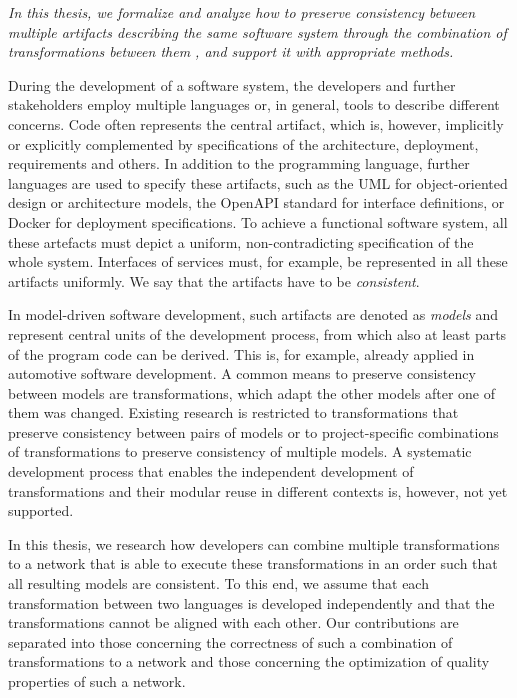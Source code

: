 \emph{In this thesis, we formalize and analyze how to preserve consistency between multiple artifacts describing the same software system through the combination of transformations between them%
, and support it with appropriate methods.}

During the development of a software system, the developers and further stakeholders employ multiple languages or, in general, tools to describe different concerns.
Code often represents the central artifact, which is, however, implicitly or explicitly complemented by specifications of the architecture, deployment, requirements and others.
In addition to the programming language, further languages are used to specify these artifacts, such as the \acrshort{UML} for object-oriented design or architecture models, the OpenAPI standard for interface definitions, or Docker for deployment specifications.
To achieve a functional software system, all these artefacts must depict a uniform, non-contradicting specification of the whole system.
Interfaces of services must, for example, be represented in all these artifacts uniformly.
We say that the artifacts have to be \emph{consistent}.

In model-driven software development, such artifacts are denoted as \emph{models} and represent central units of the development process, from which also at least parts of the program code can be derived.
This is, for example, already applied in automotive software development.
A common means to preserve consistency between models are transformations, which adapt the other models after one of them was changed.
Existing research is restricted to transformations that preserve consistency between pairs of models or to project-specific combinations of transformations to preserve consistency of multiple models. %
A systematic development process that enables the independent development of transformations and their modular reuse in different contexts is, however, not yet supported.

In this thesis, we research how developers can combine multiple transformations to a network that is able to execute these transformations in an order such that all resulting models are consistent.
To this end, we assume that each transformation between two languages is developed independently and that the transformations cannot be aligned with each other.
Our contributions are separated into those concerning the correctness of such a combination of transformations to a network and those concerning the optimization of quality properties of such a network.

